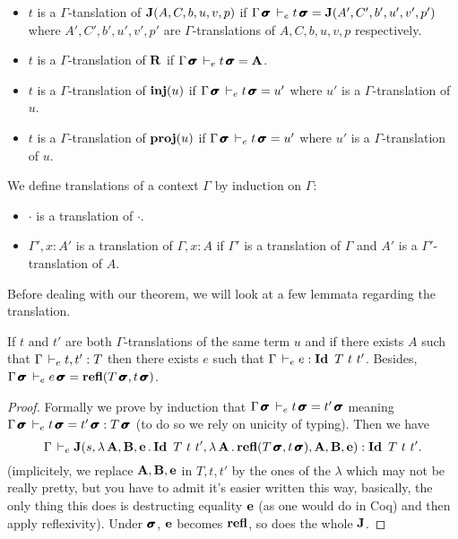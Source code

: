\documentclass[a4paper,english]{lipics-utf8x}
\begin{document}
\begin{definition}
\begin{itemize}
      \item \sloppy
            $t$ is a $\Gamma$-tanslation of $\operatorname{\mathbf{J}}(A,C,b,u,v,p)$ if
            $\Gamma \operatorname{\pmb{\bm{\sigma}}} \,\vdash_e t \operatorname{\pmb{\bm{\sigma}}} = \operatorname{\mathbf{J}}(A',C',b',u',v',p')$ where
            $A',C',b',u',v',p'$ are $\Gamma$-translations of
            $A,C,b,u,v,p$ respectively.
      \item $t$ is a $\Gamma$-translation of $\operatorname{\mathbf{R}}$ if
            $\Gamma \operatorname{\pmb{\bm{\sigma}}} \,\vdash_e t \operatorname{\pmb{\bm{\sigma}}} = \operatorname{\mathbf{A}}$.
      \item $t$ is a $\Gamma$-translation of $\operatorname{\mathbf{inj}}(u)$ if
            $\Gamma \operatorname{\pmb{\bm{\sigma}}} \,\vdash_e t \operatorname{\pmb{\bm{\sigma}}} = u'$ where $u'$ is a
            $\Gamma$-translation of $u$.
      \item $t$ is a $\Gamma$-translation of $\operatorname{\mathbf{proj}}(u)$ if
            $\Gamma \operatorname{\pmb{\bm{\sigma}}} \,\vdash_e t \operatorname{\pmb{\bm{\sigma}}} = u'$ where $u'$ is a
            $\Gamma$-translation of $u$.
    \end{itemize}
  \end{definition}

  \begin{definition}
    We define translations of a context $\Gamma$ by induction on $\Gamma$:
    \begin{itemize}
      \item $\cdot$ is a translation of $\cdot$.
      \item $\Gamma', x:A'$ is a translation of $\Gamma, x:A$ if $\Gamma'$ is
            a translation of $\Gamma$ and $A'$ is a $\Gamma'$-translation of
            $A$.
    \end{itemize}
  \end{definition}
  Before dealing with our theorem, we will look at a few lemmata regarding the
  translation.

  \begin{lemma}
    \label{lem:transleq}
    If $t$ and $t'$ are both $\Gamma$-translations of the same term $u$ and if
    there exists $A$ such that $\Gamma \,\vdash_e t, t' : T$ then there exists $e$
    such that $\Gamma \dere e : \Id T\ t\ t'$.
    Besides, $\Gamma \operatorname{\pmb{\bm{\sigma}}} \,\vdash_e e \operatorname{\pmb{\bm{\sigma}}} = \operatorname{\mathbf{refl}}(T\operatorname{\pmb{\bm{\sigma}}},t\operatorname{\pmb{\bm{\sigma}}})$.
  \end{lemma}

  \begin{proof}
    Formally we prove by induction that
    $\Gamma \operatorname{\pmb{\bm{\sigma}}} \,\vdash_e t \operatorname{\pmb{\bm{\sigma}}} = t' \operatorname{\pmb{\bm{\sigma}}}$
    meaning $\Gamma \operatorname{\pmb{\bm{\sigma}}} \,\vdash_e t \operatorname{\pmb{\bm{\sigma}}} = t' \operatorname{\pmb{\bm{\sigma}}} : T\operatorname{\pmb{\bm{\sigma}}}$
    (to do so we rely on unicity of typing).
    Then we have
    \[\Gamma \dere \J(s,\lambda \mA, \mB, \me. \Id T\ t\ t',
    \lambda \mA. \refl(T\msigma,t\msigma),\mA,\mB,\me) : \Id T\ t\ t'.\]
    (implicitely, we replace $\operatorname{\mathbf{A}},\operatorname{\mathbf{B}},\operatorname{\mathbf{e}}$ in $T,t,t'$ by the ones of the
    $\lambda$ which may not be really pretty, but you have to admit it's easier
    written this way, basically, the only thing this does is destructing
    equality $\operatorname{\mathbf{e}}$ (as one would do in Coq) and then apply reflexivity).
    Under $\operatorname{\pmb{\bm{\sigma}}}$, $\operatorname{\mathbf{e}}$ becomes $\operatorname{\mathbf{refl}}$, so does the whole $\operatorname{\mathbf{J}}$.
  \end{proof}
\end{document}
